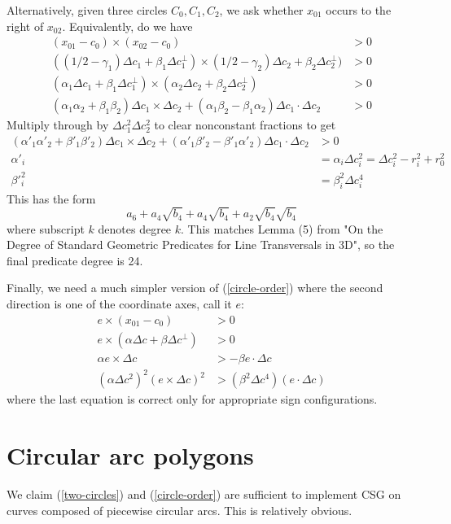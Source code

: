 \documentclass[11pt]{article}
\begin{document}
Alternatively, given three circles $C_0, C_1, C_2$, we ask whether $x_{01}$ occurs to the right of $x_{02}$.  Equivalently, do we have
\begin{align*}
(x_{01} - c_0) \times (x_{02} - c_0) &> 0 \\
((1/2 - \gamma_1) \Delta c_1 + \beta_1 \Delta c_1^\perp) \times (1/2 - \gamma_2) \Delta c_2 + \beta_2 \Delta c_2^\perp) &> 0 \\
(\alpha_1 \Delta c_1 + \beta_1 \Delta c_1^\perp) \times (\alpha_2 \Delta c_2 + \beta_2 \Delta c_2^\perp) &> 0 \\
(\alpha_1 \alpha_2 + \beta_1 \beta_2) \Delta c_1 \times \Delta c_2 + (\alpha_1 \beta_2 - \beta_1 \alpha_2) \Delta c_1 \cdot \Delta c_2 &> 0
\end{align*}
Multiply through by $\Delta c_1^2 \Delta c_2^2$ to clear nonconstant fractions to get
\begin{align} \label{circle-order}
(\alpha'_1 \alpha'_2 + \beta'_1 \beta'_2) \Delta c_1 \times \Delta c_2 + (\alpha'_1 \beta'_2 - \beta'_1 \alpha'_2) \Delta c_1 \cdot \Delta c_2 &> 0 \\
\alpha'_i &= \alpha_i \Delta c_i^2 = \Delta c_i^2 - r_i^2 + r_0^2 \\
\beta'^2_i &= \beta_i^2 \Delta c_i^4
\end{align}
This has the form
$$a_6 + a_4 \sqrt{b_4} + a_4 \sqrt{b_4} + a_2 \sqrt{b_4} \sqrt{b_4}$$
where subscript $k$ denotes degree $k$.  This matches Lemma (5) from "On the Degree of Standard Geometric Predicates for Line Transversals in 3D", so the final predicate degree is 24.

Finally, we need a much simpler version of (\ref{circle-order}) where the second direction is one of the coordinate axes, call it $e$:
\begin{align*}
e \times (x_{01} - c_0) &> 0 \\
e \times (\alpha \Delta c + \beta \Delta c^\perp) &> 0 \\
\alpha e \times \Delta c &> -\beta e \cdot \Delta c \\
(\alpha \Delta c^2)^2 (e \times \Delta c)^2 &> (\beta^2 \Delta c^4) (e \cdot \Delta c)
\end{align*}
where the last equation is correct only for appropriate sign configurations.

\section{Circular arc polygons}

We claim (\ref{two-circles}) and (\ref{circle-order}) are sufficient to implement CSG on curves composed of piecewise circular arcs.  This is relatively obvious.
\end{document}
